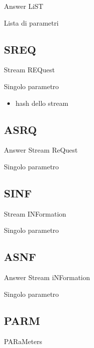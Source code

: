 Answer LiST



Lista di parametri






\subsection{SREQ}
%

Stream REQuest



Singolo parametro



\begin{itemize}
\item hash dello stream
\end{itemize}




\subsection{ASRQ}
%

Answer Stream ReQuest



Singolo parametro






\subsection{SINF}
%

Stream INFormation



Singolo parametro






\subsection{ASNF}
%

Answer Stream iNFormation



Singolo parametro






\subsection{PARM}
%

PARaMeters






